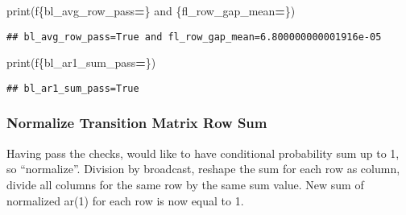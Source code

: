 \documentclass[
]{book}
\newenvironment{Shaded}{\begin{snugshade}}{\end{snugshade}}
\newcommand{\BuiltInTok}[1]{#1}
\newcommand{\NormalTok}[1]{#1}
\newcommand{\OperatorTok}[1]{\textcolor[rgb]{0.81,0.36,0.00}{\textbf{#1}}}
\newcommand{\SpecialCharTok}[1]{\textcolor[rgb]{0.00,0.00,0.00}{#1}}
\newcommand{\SpecialStringTok}[1]{\textcolor[rgb]{0.31,0.60,0.02}{#1}}
\begin{document}
\begin{Shaded}
\begin{Highlighting}[]
\BuiltInTok{print}\NormalTok{(}\SpecialStringTok{f\textquotesingle{}}\SpecialCharTok{\{}\NormalTok{bl\_avg\_row\_pass}\OperatorTok{=}\SpecialCharTok{\}}\SpecialStringTok{ and }\SpecialCharTok{\{}\NormalTok{fl\_row\_gap\_mean}\OperatorTok{=}\SpecialCharTok{\}}\SpecialStringTok{\textquotesingle{}}\NormalTok{)}
\end{Highlighting}
\end{Shaded}

\begin{verbatim}
## bl_avg_row_pass=True and fl_row_gap_mean=6.800000000001916e-05
\end{verbatim}

\begin{Shaded}
\begin{Highlighting}[]
\BuiltInTok{print}\NormalTok{(}\SpecialStringTok{f\textquotesingle{}}\SpecialCharTok{\{}\NormalTok{bl\_ar1\_sum\_pass}\OperatorTok{=}\SpecialCharTok{\}}\SpecialStringTok{\textquotesingle{}}\NormalTok{)}
\end{Highlighting}
\end{Shaded}

\begin{verbatim}
## bl_ar1_sum_pass=True
\end{verbatim}

\hypertarget{normalize-transition-matrix-row-sum}{%
\subsubsection{Normalize Transition Matrix Row Sum}\label{normalize-transition-matrix-row-sum}}

Having pass the checks, would like to have conditional probability sum up to 1, so ``normalize''. Division by broadcast, reshape the sum for each row as column, divide all columns for the same row by the same sum value. New sum of normalized ar(1) for each row is now equal to 1.
\end{document}
